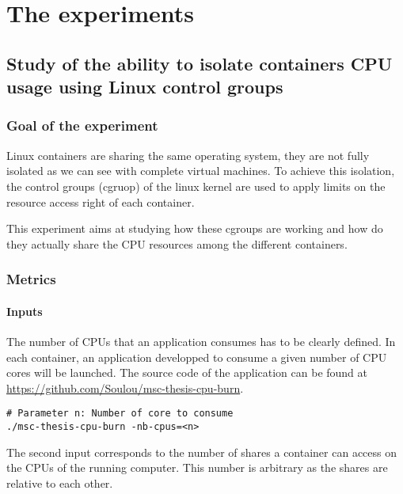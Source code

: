 \chapter{The experiments}
\label{experiments}

\section{Study of the ability to isolate containers CPU usage using Linux control groups}
\subsection{Goal of the experiment}

Linux containers are sharing the same operating system, they are not fully
isolated as we can see with complete virtual machines. To achieve this
isolation, the control groups (cgruop) of the linux kernel are used to
apply limits on the resource access right of each container.

This experiment aims at studying how these cgroups are working and how
do they actually share the CPU resources among the different containers.

\subsection{Metrics}

\subsubsection{Inputs}

The number of CPUs that an application consumes has to be clearly defined. In
each container, an application developped to consume a given number of CPU
cores will be launched. The source code of the application can be found at
\url{https://github.com/Soulou/msc-thesis-cpu-burn}.

\vspace{1em}

\lstset{language=bash}
\begin{lstlisting}
# Parameter n: Number of core to consume
./msc-thesis-cpu-burn -nb-cpus=<n>
\end{lstlisting}

The second input corresponds to the number of shares a container can access
on the CPUs of the running computer. This number is arbitrary as the shares
are relative to each other. 

